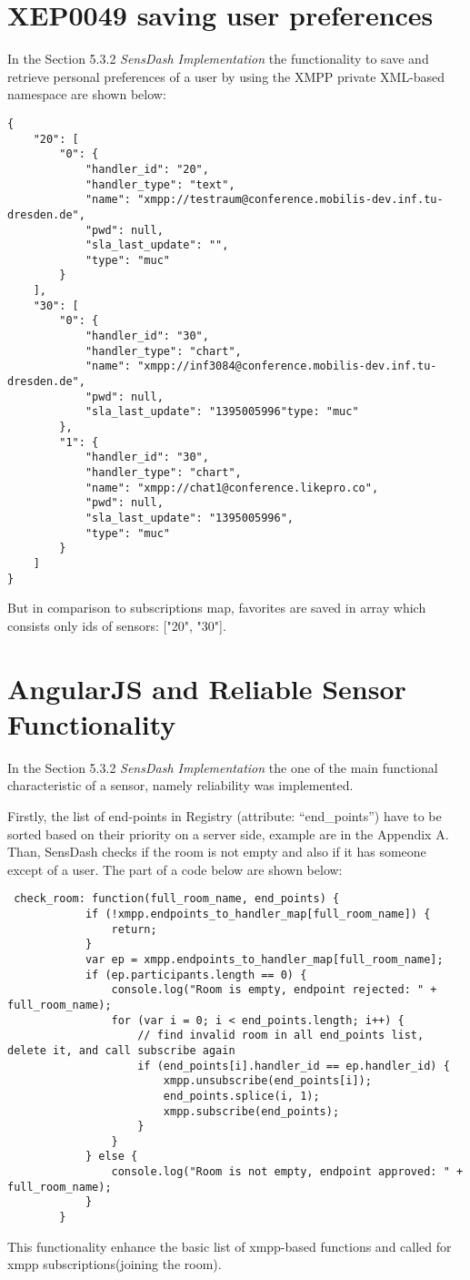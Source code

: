 \chapter{XEP0049 saving user preferences}
In the Section 5.3.2 \emph{SensDash Implementation} the functionality to save and retrieve personal preferences of a user by using the XMPP private XML-based namespace are shown below:
\begin{lstlisting}
{
    "20": [
        "0": {
            "handler_id": "20",
            "handler_type": "text",
            "name": "xmpp://testraum@conference.mobilis-dev.inf.tu-dresden.de",
            "pwd": null,
            "sla_last_update": "",
            "type": "muc"
        }
    ],
    "30": [
        "0": {
            "handler_id": "30",
            "handler_type": "chart",
            "name": "xmpp://inf3084@conference.mobilis-dev.inf.tu-dresden.de",
            "pwd": null,
            "sla_last_update": "1395005996"type: "muc"
        },
        "1": {
            "handler_id": "30",
            "handler_type": "chart",
            "name": "xmpp://chat1@conference.likepro.co",
            "pwd": null,
            "sla_last_update": "1395005996",
            "type": "muc"
        }
    ]
}
\end{lstlisting}
But in comparison to subscriptions map, favorites are saved in array which consists only ids of sensors: ["20", "30"].

\chapter{AngularJS and Reliable Sensor Functionality}
In the Section 5.3.2 \emph{SensDash Implementation} the one of the main functional characteristic of a sensor, namely reliability was implemented.

Firstly, the list of end-points in Registry (attribute: ``end\_points'') have to be sorted based on their priority on a server side, example are in the Appendix A. Than, SensDash checks if the room is not empty and also if it has someone except of a user. The part of a code below are shown below:
\begin{lstlisting}
 check_room: function(full_room_name, end_points) {
            if (!xmpp.endpoints_to_handler_map[full_room_name]) {
                return;
            }
            var ep = xmpp.endpoints_to_handler_map[full_room_name];
            if (ep.participants.length == 0) {
                console.log("Room is empty, endpoint rejected: " + full_room_name);
                for (var i = 0; i < end_points.length; i++) {
                    // find invalid room in all end_points list, delete it, and call subscribe again
                    if (end_points[i].handler_id == ep.handler_id) {
                        xmpp.unsubscribe(end_points[i]);
                        end_points.splice(i, 1);
                        xmpp.subscribe(end_points);
                    }
                }
            } else {
                console.log("Room is not empty, endpoint approved: " + full_room_name);
            }
        }
\end{lstlisting}
This functionality enhance the basic list of xmpp-based functions and called for xmpp subscriptions(joining the room).

